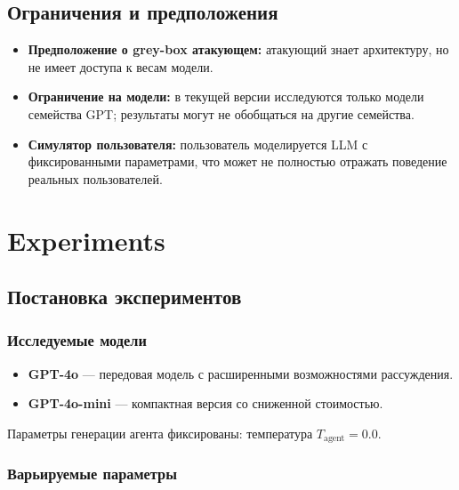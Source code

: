 \documentclass{article}
\begin{document}
\subsection{Ограничения и предположения}

\begin{itemize}
    \item \textbf{Предположение о grey-box атакующем:} атакующий знает архитектуру, но не имеет доступа к весам модели.
    \item \textbf{Ограничение на модели:} в текущей версии исследуются только модели семейства GPT; результаты могут не обобщаться на другие семейства.
    \item \textbf{Симулятор пользователя:} пользователь моделируется LLM с фиксированными параметрами, что может не полностью отражать поведение реальных пользователей.
\end{itemize}

\section{Experiments}

\subsection{Постановка экспериментов}

\subsubsection{Исследуемые модели}

\begin{itemize}
    \item \textbf{GPT-4o} --- передовая модель с расширенными возможностями рассуждения.
    \item \textbf{GPT-4o-mini} --- компактная версия со сниженной стоимостью.
\end{itemize}

Параметры генерации агента фиксированы: температура $T_{\text{agent}} = 0.0$.


\subsubsection{Варьируемые параметры}
\end{document}
